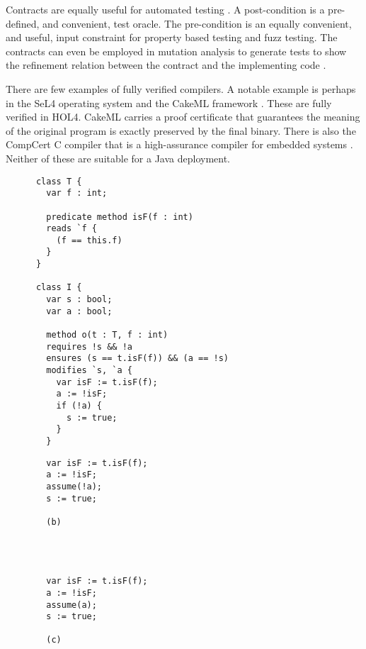 \documentclass[11pt,onecolumn,notitlepage]{article}
\begin{document}
Contracts are equally useful for automated testing \cite{10.1007/978-3-540-69507-3_9, Ciupa05automatictesting, 8471992, 8972014}. A post-condition is a pre-defined, and convenient, test oracle. The pre-condition is an equally convenient, and useful, input constraint for property based testing and fuzz testing. The contracts can even be employed in mutation analysis to generate tests to show the refinement relation between the contract and the implementing code \cite{KRENN200971}. 

There are few examples of fully verified compilers. A notable example is perhaps in the SeL4 operating system and the CakeML framework \cite{10.1145/1631687.1596566,ESOP18}. These are fully verified in HOL4. CakeML carries a proof certificate that guarantees the meaning of the original program is exactly preserved by the final binary. There is also the CompCert C compiler that is a high-assurance compiler for embedded systems \cite{Leroy-backend,2008-Leroy-Blazy-memory-model}. Neither of these are suitable for a Java deployment.

\newsavebox{\boxa}
\begin{lrbox}{\boxa}
    \begin{lstlisting}
      class T {
        var f : int;

        predicate method isF(f : int)
        reads `f {
          (f == this.f)
        }
      }
      
      class I {
        var s : bool;
        var a : bool;

        method o(t : T, f : int)
        requires !s && !a
        ensures (s == t.isF(f)) && (a == !s) 
        modifies `s, `a {
          var isF := t.isF(f);
          a := !isF;
          if (!a) {
            s := true;
          }
        }
    \end{lstlisting}
\end{lrbox}

\newsavebox{\boxb}
\begin{lrbox}{\boxb}
    \begin{lstlisting}
        var isF := t.isF(f);
        a := !isF;
        assume(!a);
        s := true;

        (b)




        var isF := t.isF(f);
        a := !isF;
        assume(a);
        s := true;

        (c)
    \end{lstlisting}
\end{lrbox}
\end{document}

